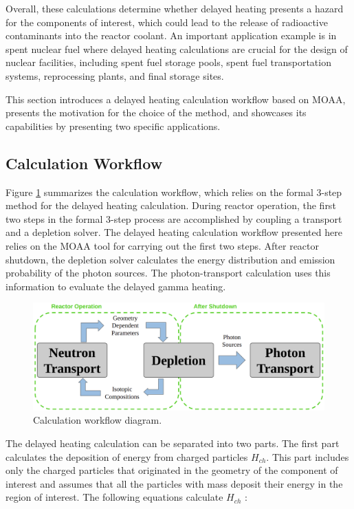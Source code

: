 Overall, these calculations determine whether delayed heating presents a hazard for the components of interest, which could lead to the release of radioactive contaminants into the reactor coolant.
An important application example is in spent nuclear fuel where delayed heating calculations are crucial for the design of nuclear facilities, including spent fuel storage pools, spent fuel transportation systems, reprocessing plants, and final storage sites.

This section introduces a delayed heating calculation workflow based on MOAA, presents the motivation for the choice of the method, and showcases its capabilities by presenting two specific applications.

\subsection{Calculation Workflow}
\label{sec:delheat}

Figure \ref{fig:workflow_0} summarizes the calculation workflow, which relies on the formal 3-step method for the delayed heating calculation.
During reactor operation, the first two steps in the formal 3-step process are accomplished by coupling a transport and a depletion solver.
The delayed heating calculation workflow presented here relies on the \gls*{MOAA} tool \cite{fairhurst_development_2022} for carrying out the first two steps.
After reactor shutdown, the depletion solver calculates the energy distribution and emission probability of the photon sources.
The photon-transport calculation uses this information to evaluate the delayed gamma heating.

\begin{figure}[htbp!]
  \begin{center}
    \includegraphics[width=0.80\linewidth]{figures/calc_w}
  \end{center}
  \caption{Calculation workflow diagram.}
  \label{fig:workflow_0}
\end{figure}

The delayed heating calculation can be separated into two parts.
The first part calculates the deposition of energy from charged particles $H_{ch}$.
This part includes only the charged particles that originated in the geometry of the component of interest and assumes that all the particles with mass deposit their energy in the region of interest.
The following equations calculate $H_{ch}$ \cite{giot_decay_2018, endf, peterson-droogh_current_2018}:

